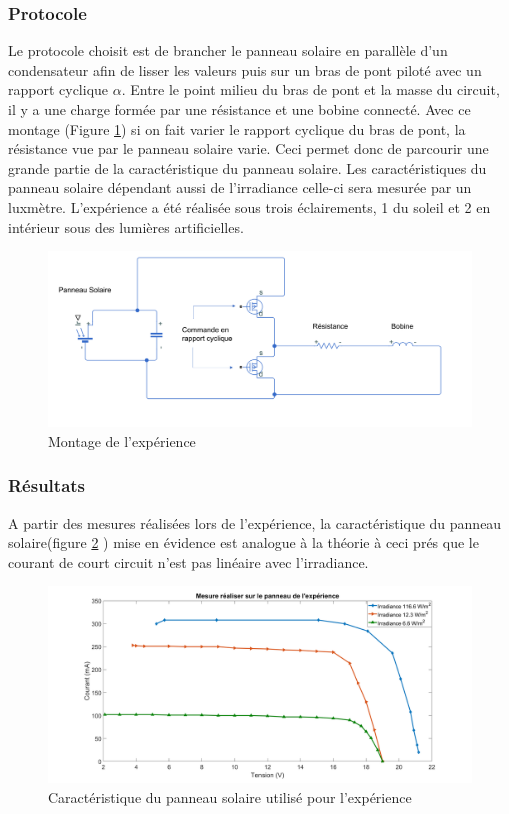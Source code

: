 \documentclass{rapportENS}
\begin{document}
  \subsubsection*{Protocole}
 Le protocole choisit est de brancher le panneau solaire en parallèle d'un condensateur afin de lisser les valeurs puis sur un bras de pont piloté avec un rapport cyclique $\alpha$. Entre le point milieu du bras de pont et la masse du circuit, il y a une charge formée par une résistance et une bobine connecté. Avec ce montage (Figure \ref{fig:exp}) si on fait varier le rapport cyclique du bras de pont, la résistance vue par le panneau solaire varie. Ceci permet donc de parcourir une grande partie de la caractéristique du panneau solaire. Les caractéristiques du panneau solaire dépendant aussi de l'irradiance celle-ci sera mesurée par un luxmètre. L'expérience a été réalisée sous trois éclairements, 1 du soleil et 2 en intérieur sous des lumières artificielles.
 
 \begin{figure}[h!]
     \centering
     \includegraphics[width=0.9\linewidth]{exp_montage.png}
     \caption{Montage de l'expérience}
     \label{fig:exp}
 \end{figure}
 
 \subsubsection*{Résultats}
 
 A partir des mesures réalisées lors de l'expérience, la caractéristique du panneau solaire(figure \ref{fig:plot_exp} ) mise en évidence est analogue à la théorie à ceci prés que le courant de court circuit n'est pas linéaire avec l'irradiance.
 
 \begin{figure}[h!]
     \centering
     \includegraphics[width=\linewidth]{plot_exp.png}
     \caption{Caractéristique du panneau solaire utilisé pour l'expérience}
     \label{fig:plot_exp}
 \end{figure}
 
\end{document}
